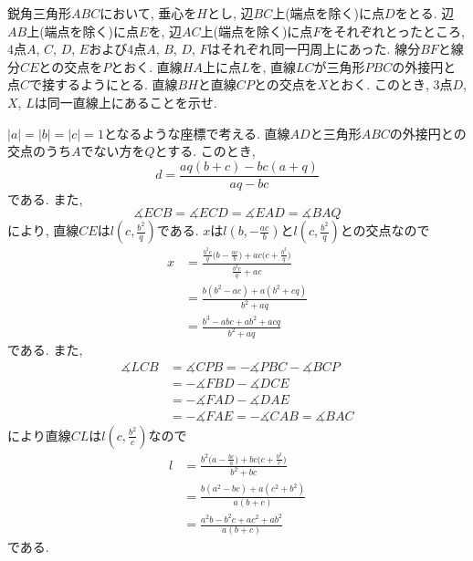 \begin{bprb}[Balkan MO 2025-2]
鋭角三角形$ABC$において, 垂心を$H$とし, 辺$BC$上(端点を除く)に点$D$をとる.
辺$AB$上(端点を除く)に点$E$を, 辺$AC$上(端点を除く)に点$F$をそれぞれとったところ, $4$点$A$, $C$, $D$, $E$および$4$点$A$, $B$, $D$, $F$はそれぞれ同一円周上にあった.
線分$BF$と線分$CE$との交点を$P$とおく.
直線$HA$上に点$L$を, 直線$LC$が三角形$PBC$の外接円と点$C$で接するようにとる.
直線$BH$と直線$CP$との交点を$X$とおく.
このとき, $3$点$D$, $X$, $L$は同一直線上にあることを示せ.
\end{bprb}
\begin{ifsol*}
$\lvert a\rvert=\lvert b\rvert=\lvert c\rvert=1$となるような座標で考える.
直線$AD$と三角形$ABC$の外接円との交点のうち$A$でない方を$Q$とする.
このとき,
\[d=\frac{aq(b+c)-bc(a+q)}{aq-bc}\]
である.
また,
\[\measuredangle ECB=\measuredangle ECD=\measuredangle EAD=\measuredangle BAQ\]
により, 直線$CE$は$l(c,\frac{b^2}q)$である.
$x$は$l(b,-\frac{ac}b)$と$l(c,\frac{b^2}q)$との交点なので
\begin{align*}
x
&=\frac{\frac{b^2c}q\bigl(b-\frac{ac}b\bigr)+ac\bigl(c+\frac{b^2}q\bigr)}{\frac{b^2c}q+ac}\\
&=\frac{b(b^2-ac)+a(b^2+cq)}{b^2+aq}\\
&=\frac{b^3-abc+ab^2+acq}{b^2+aq}
\end{align*}
である.
また,
\begin{align*}
\measuredangle LCB
&=\measuredangle CPB=-\measuredangle PBC-\measuredangle BCP\\
&=-\measuredangle FBD-\measuredangle DCE\\
&=-\measuredangle FAD-\measuredangle DAE\\
&=-\measuredangle FAE=-\measuredangle CAB=\measuredangle BAC
\end{align*}
により直線$CL$は$l(c,\frac{b^2}c)$なので
\begin{align*}
l
&=\frac{b^2\bigl(a-\frac{bc}a\bigr)+bc\bigl(c+\frac{b^2}c\bigr)}{b^2+bc}\\
&=\frac{b(a^2-bc)+a(c^2+b^2)}{a(b+c)}\\
&=\frac{a^2b-b^2c+ac^2+ab^2}{a(b+c)}
\end{align*}
である.


\end{ifsol*}
